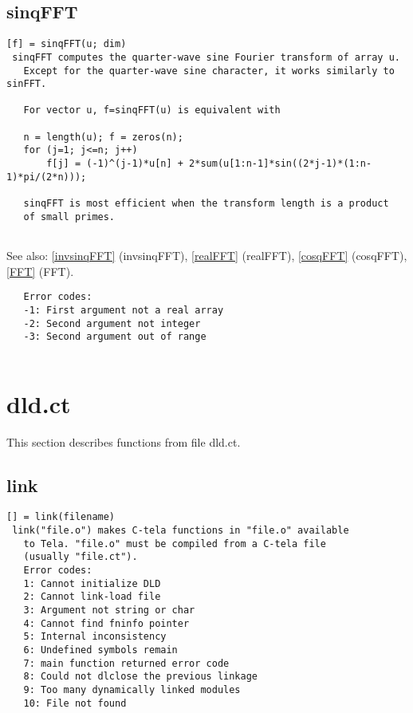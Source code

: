 \documentclass[a4paper]{article}
\begin{document}
\subsection{sinqFFT\label{sinqFFT}}

\begin{tscreen}
\begin{verbatim}
[f] = sinqFFT(u; dim)
 sinqFFT computes the quarter-wave sine Fourier transform of array u.
   Except for the quarter-wave sine character, it works similarly to sinFFT.
   
   For vector u, f=sinqFFT(u) is equivalent with

   n = length(u); f = zeros(n);
   for (j=1; j<=n; j++)
       f[j] = (-1)^(j-1)*u[n] + 2*sum(u[1:n-1]*sin((2*j-1)*(1:n-1)*pi/(2*n)));

   sinqFFT is most efficient when the transform length is a product
   of small primes.
           
\end{verbatim}

See also: \ref{invsinqFFT} {(invsinqFFT)}, \ref{realFFT} {(realFFT)}, \ref{cosqFFT} {(cosqFFT)}, \ref{FFT} {(FFT)}.
\begin{verbatim}
   Error codes:
   -1: First argument not a real array
   -2: Second argument not integer
   -3: Second argument out of range
   
\end{verbatim}
\end{tscreen}





\section{dld.ct}

This section describes functions from file dld.ct.




\subsection{link\label{link}}

\begin{tscreen}
\begin{verbatim}
[] = link(filename)
 link("file.o") makes C-tela functions in "file.o" available
   to Tela. "file.o" must be compiled from a C-tela file
   (usually "file.ct").
   Error codes:
   1: Cannot initialize DLD
   2: Cannot link-load file
   3: Argument not string or char
   4: Cannot find fninfo pointer
   5: Internal inconsistency
   6: Undefined symbols remain
   7: main function returned error code
   8: Could not dlclose the previous linkage
   9: Too many dynamically linked modules
   10: File not found
   
\end{verbatim}
\end{tscreen}
\end{document}
